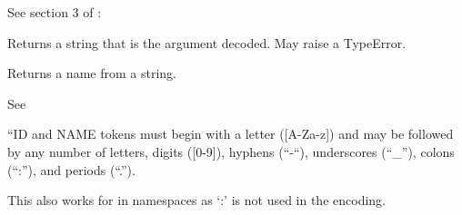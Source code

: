\documentclass[letterpaper,10pt,english]{sphinxmanual}
\begin{document}
\begin{fulllineitems}
\begin{sphinxVerbatim}[commandchars=\\\{\}]
                                           
                              
                                        
                              
                              
\end{sphinxVerbatim}

See section 3 of : 

\end{fulllineitems}


\begin{fulllineitems}
\label{\detokenize{ref/util/XmlWrite:TotalDepth.util.XmlWrite.decodeString}}
Returns a string that is the argument decoded. May raise a TypeError.

\end{fulllineitems}


\begin{fulllineitems}
\label{\detokenize{ref/util/XmlWrite:TotalDepth.util.XmlWrite.nameFromString}}
Returns a name from a string.

See 

“ID and NAME tokens must begin with a letter ({[}A-Za-z{]}) and may be
followed by any number of letters, digits ({[}0-9{]}), hyphens (“-“),
underscores (“\_”), colons (“:”), and periods (“.”).

This also works for in namespaces as ‘:’ is not used in the encoding.

\end{fulllineitems}

\end{document}
